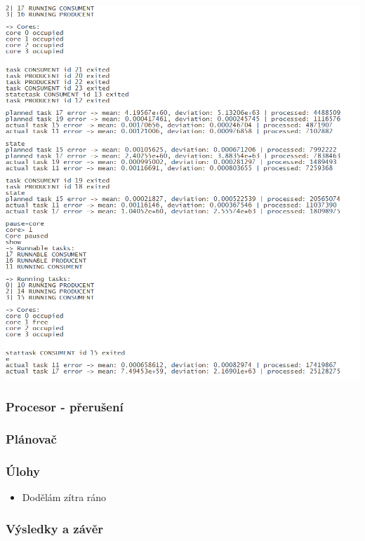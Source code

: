 \documentclass{beamer}
\begin{document}
\begin{frame} 
\includegraphics[height=\textheight]{obrazky/screen.png}

\end{frame}

\begin{frame} %
\frametitle{Procesor - přerušení}

\end{frame}

\begin{frame} %
\frametitle{Plánovač}

\end{frame}

\begin{frame} %
\frametitle{Úlohy}
\begin{itemize}
\item Dodělám zítra ráno
\end{itemize}
\end{frame}

\begin{frame} 
\frametitle{Výsledky a závěr}

\end{frame}
\end{document}

